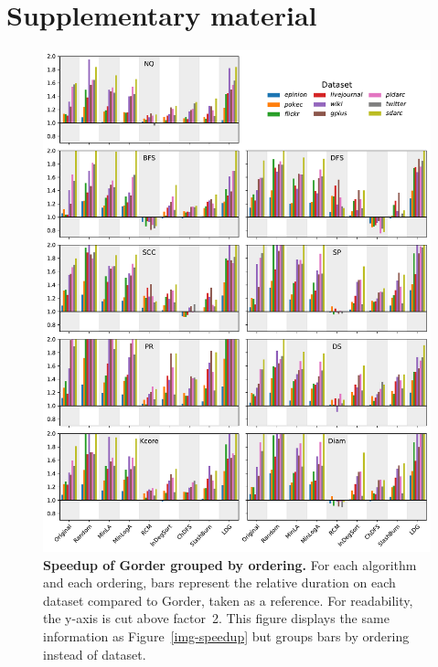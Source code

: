 \setlength{\textheight}{\textheight+\footskip}
\newpage
\setlength{\footskip}{0pt}

\section*{Supplementary material}

\begin{figure}[h!] 
    \begin{adjustwidth}{-20mm}{-10mm}
    \centering 
    \includegraphics[width=\linewidth]{img/img-speedup-grouped.pdf}
    \caption{\textbf{Speedup of Gorder grouped by ordering.} For each algorithm and each ordering, bars represent the relative duration on each dataset compared to Gorder, taken as a reference. For readability, the y-axis is cut above factor~2. This figure displays the same information as Figure~\ref{img-speedup} but groups bars by ordering instead of dataset.}\label{img-speedup-grouped}
    \end{adjustwidth}
\end{figure}

